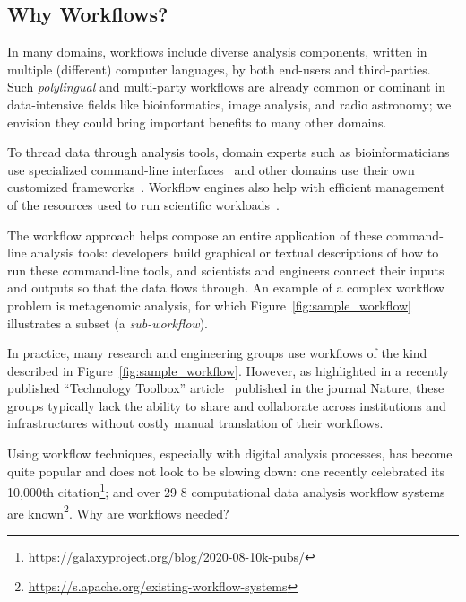 \documentclass[sigconf,revew,screen,timestamp,nonacm]{acmart}
\newcommand{\addition}[1]{{\color{brown} #1}}
\newcommand{\modification}[1]{{\color{blue} #1}}
\newcommand{\todortwo}[1]{\todo[linecolor=white,color=KamPurple!40]{R2.#1}}
\begin{document}
\subsection{Why Workflows?}\label{sec:bg:workflows}
\addition{In many domains, workflows include diverse analysis components, written in multiple (different) computer languages, by both end-users and third-parties. Such \emph{polylingual} and multi-party workflows are already common or dominant in data-intensive fields like bioinformatics, image analysis, and radio astronomy; we envision they could bring important benefits to many other domains.

To thread data through analysis tools, domain experts such as bioinformaticians use specialized command-line interfaces~\cite{seemann_ten_2013,georgeson_bionitio_2019} and other domains use their own customized frameworks~\cite{babuji_parsl_2019,berthold_knime_2009}. Workflow engines also help with efficient management of the resources used to run scientific workloads~\cite{deelman_pegasus_2015,couvares_workflow_2007}.

The workflow approach helps compose an entire application of these command-line analysis tools: developers build graphical or textual descriptions of how to run these command-line tools, and scientists and engineers connect their inputs and outputs so that the data flows through. An example of a complex workflow problem is metagenomic analysis, for which Figure~\ref{fig:sample_workflow} illustrates a subset (a \textit{sub-workflow}).

In practice, many research and engineering groups use workflows of the kind described in Figure~\ref{fig:sample_workflow}. However, as highlighted in a recently published ``Technology Toolbox'' article~\cite{perkel_workflow_2019} published in the journal Nature, these groups typically lack the ability to share and collaborate across institutions and infrastructures without costly manual translation of their workflows.}

Using workflow techniques, especially with digital analysis processes, has become quite popular and does not look to be slowing down: one \todortwo{19}{\modification{workflow management system}} recently celebrated its 10,000th citation\footnote{\url{https://galaxyproject.org/blog/2020-08-10k-pubs/}}; and over 29\modification{8} computational \addition{data analysis} workflow systems are known\footnote{\url{https://s.apache.org/existing-workflow-systems}}. Why are workflows needed?
\end{document}
